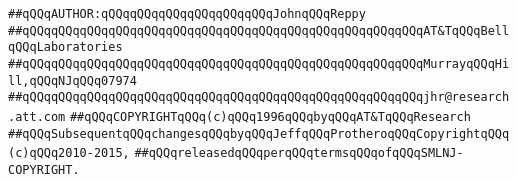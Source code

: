 \newline
\newline
\newline
\newline
\verb|##qQQqAUTHOR:qQQqqQQqqQQqqQQqqQQqqQQqJohnqQQqReppy|\newline
\verb|##qQQqqQQqqQQqqQQqqQQqqQQqqQQqqQQqqQQqqQQqqQQqqQQqqQQqqQQqAT&TqQQqBellqQQqLaboratories|\newline
\verb|##qQQqqQQqqQQqqQQqqQQqqQQqqQQqqQQqqQQqqQQqqQQqqQQqqQQqqQQqMurrayqQQqHill,qQQqNJqQQq07974|\newline
\verb|##qQQqqQQqqQQqqQQqqQQqqQQqqQQqqQQqqQQqqQQqqQQqqQQqqQQqqQQqjhr@research.att.com|\newline
\verb|##qQQqCOPYRIGHTqQQq(c)qQQq1996qQQqbyqQQqAT&TqQQqResearch|\newline
\verb|##qQQqSubsequentqQQqchangesqQQqbyqQQqJeffqQQqProtheroqQQqCopyrightqQQq(c)qQQq2010-2015,|\newline
\verb|##qQQqreleasedqQQqperqQQqtermsqQQqofqQQqSMLNJ-COPYRIGHT.|\newline
\newline
\newline
\newline

